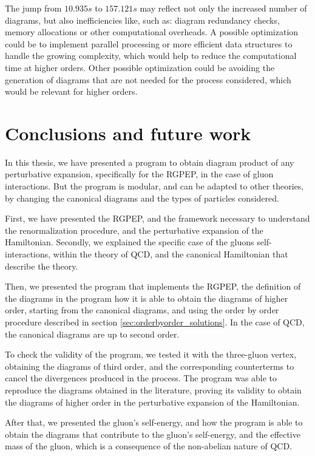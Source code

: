\documentclass[11pt,a4paper,twoside,pdf]{article}
\numberwithin{equation}{section}
\begin{document}
The jump from $10.935 s$ to $157.121 s$ may reflect not only the increased number of diagrams, 
but also inefficiencies like, such as: diagram redundancy checks, memory allocations or 
other computational overheads. A possible optimization could be to implement 
parallel processing or more efficient data structures to handle the growing complexity, 
which would help to reduce the computational time at higher orders. Other possible
optimization could be avoiding the generation of diagrams that are not needed for the 
process considered, which would be relevant for higher orders.

\newpage

\section{Conclusions and future work} \label{sec:conclusions}

In this thesis, we have presented a program to obtain diagram product of any 
perturbative expansion, specifically for the RGPEP, in the case of gluon interactions.
But the program is modular, and can be adapted to other theories, by changing the
canonical diagrams and the types of particles considered. 

First, we have presented the RGPEP, and the framework necessary to understand the 
renormalization procedure, and the perturbative expansion of the Hamiltonian. Secondly, 
we explained the specific case of the gluons self-interactions, within the
theory of QCD, and the canonical Hamiltonian that describe the theory.

Then, we presented the program that implements the RGPEP, the definition of the diagrams 
in the program how it is able to obtain the diagrams of higher order, starting
from the canonical diagrams, and using the order by order procedure described in section
\ref{sec:orderbyorder_solutions}. In the case of QCD, the canonical diagrams are up to 
second order. 

To check the validity of the program, we tested it with the three-gluon vertex,
obtaining the diagrams of third order, and the corresponding counterterms to cancel
the divergences produced in the process. The program was able to reproduce the
diagrams obtained in the literature, proving its validity to obtain the diagrams of
higher order in the perturbative expansion of the Hamiltonian.

After that, we presented the gluon's self-energy, and how the program is able to
obtain the diagrams that contribute to the gluon's self-energy, and the effective mass
of the gluon, which is a consequence of the non-abelian nature of QCD.
\end{document}

